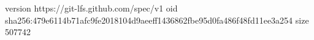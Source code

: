 version https://git-lfs.github.com/spec/v1
oid sha256:479e6114b71afc9fe2018104d9aeeff1436862fbe95d0fa486f48fd11ee3a254
size 507742
